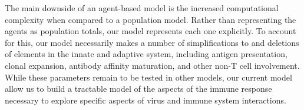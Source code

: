 \documentclass[10pt]{article}
\begin{document}
The main downside of an agent-based model is the increased computational complexity when compared to a population model.  Rather than representing the agents as population totals, our model represents each one explicitly.  To account for this, our model necessarily makes a number of simplifications to and deletions of elements in the innate and adaptive system, including antigen presentation, clonal expansion, antibody affinity maturation, and other non-T cell involvement. While these parameters remain to be tested in other models, our current model allow us to build a tractable model of the aspects of the immune response necessary to explore specific aspects of virus and immune system interactions.

\end{document}
